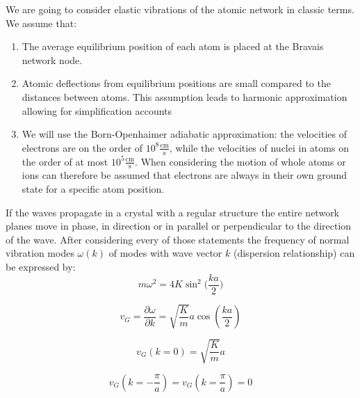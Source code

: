 We are going to consider elastic vibrations of the atomic network in classic
terms. We assume that:
\begin{enumerate}
\item The average equilibrium position of each atom is placed at the Bravais 
        network node.
\item Atomic deflections from equilibrium positions are small compared to the
        distances between atoms. This assumption leads to harmonic 
        approximation allowing for simplification accounts
\item We will use the Born-Openhaimer adiabatic approximation: the velocities
        of electrons are on the order of $10^8 \mathrm{\frac{cm}{s}}$, while 
        the velocities of nuclei in atoms on the order of at most $10^5 \mathrm
        {\frac{cm}{s}}$. When considering the motion of whole atoms or ions can 
        therefore be assumed that electrons are always in their own
        ground state for a specific atom position.
\end{enumerate}
If the waves propagate in a crystal with a regular structure the entire network planes move in phase, in direction or in parallel or perpendicular to the direction of the wave. After considering every of those statements the frequency of normal vibration modes
$\omega(k)$ of modes with wave vector $k$ (dispersion relationship) can be expressed by:
\begin{equation}
    m\omega^2 = 4K \sin^2\bigg(\frac{ka}{2}\bigg)  
\end{equation}

$$v_G = \frac{\partial \omega}{\partial k} = 
     \sqrt{\frac{K}{m}} a \cos\left(\frac{ka}{2} \right)$$

$$v_G(k=0) = \sqrt{\frac{K}{m}} a$$

$$v_G\left(k=-\frac{\pi}{a}\right)= v_G\left(k=\frac{\pi}{a}\right) = 0$$
